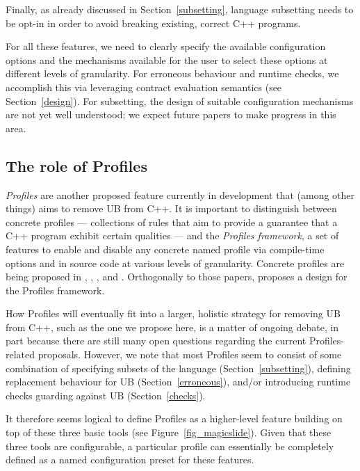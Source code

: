 Finally, as already discussed in Section~\ref{subsetting}, language subsetting needs to be opt-in in order to avoid breaking existing, correct C++ programs.

For all these features, we need to clearly specify the available configuration options and the mechanisms available for the user to select these options at different levels of granularity. For erroneous behaviour and runtime checks, we accomplish this via leveraging contract evaluation semantics (see Section~\ref{design}). For subsetting, the design of suitable configuration mechanisms are not yet well understood; we expect future papers to make progress in this area.

\subsection{The role of Profiles}
\label{profiles}

\emph{Profiles} are another proposed feature currently in development that (among other things) aims to remove UB from C++. It is important to distinguish between concrete profiles --- collections of rules that aim to provide a guarantee that a C++ program exhibit certain qualities --- and the \emph{Profiles framework}, a set of features to enable and disable any concrete named profile via compile-time options and in source code at various levels of granularity. Concrete profiles are being proposed in \cite{P3081R2}, \cite{P3038R0}, \cite{P3402R3}, and \cite{P3446R0}. Orthogonally to those papers, \cite{P3589R2} proposes a design for the Profiles framework.

How Profiles will eventually fit into a larger, holistic strategy for removing UB from C++, such as the one we propose here, is a matter of ongoing debate, in part because there are still many open questions regarding the current Profiles-related proposals. However, we note that most Profiles seem to consist of some combination of specifying subsets of the language (Section~\ref{subsetting}), defining replacement behaviour for UB (Section~\ref{erroneous}), and/or introducing runtime checks guarding against UB (Section~\ref{checks}).

It therefore seems logical to define Profiles as a higher-level feature building on top of these three basic tools (see Figure~\ref{fig_magicslide}). Given that these three tools are configurable, a particular profile can essentially be completely defined as a named configuration preset for these features. 

